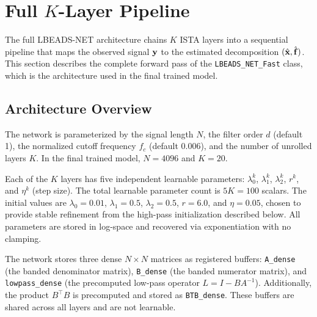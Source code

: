 \section{Full $K$-Layer Pipeline}
\label{sec:method_pipeline}

The full LBEADS-NET architecture chains $K$ ISTA layers into a sequential pipeline that maps the observed signal $\mathbf{y}$ to the estimated decomposition $(\hat{\mathbf{x}}, \hat{\mathbf{f}})$. This section describes the complete forward pass of the \texttt{LBEADS\_NET\_Fast} class, which is the architecture used in the final trained model.


\subsection{Architecture Overview}
\label{sec:method_architecture}

The network is parameterized by the signal length $N$, the filter order $d$ (default 1), the normalized cutoff frequency $f_c$ (default 0.006), and the number of unrolled layers $K$. In the final trained model, $N = 4096$ and $K = 20$.

Each of the $K$ layers has five independent learnable parameters: $\lambda_0^k$, $\lambda_1^k$, $\lambda_2^k$, $r^k$, and $\eta^k$ (step size). The total learnable parameter count is $5K = 100$ scalars. The initial values are $\lambda_0 = 0.01$, $\lambda_1 = 0.5$, $\lambda_2 = 0.5$, $r = 6.0$, and $\eta = 0.05$, chosen to provide stable refinement from the high-pass initialization described below. All parameters are stored in log-space and recovered via exponentiation with no clamping.

The network stores three dense $N \times N$ matrices as registered buffers: \texttt{A\_dense} (the banded denominator matrix), \texttt{B\_dense} (the banded numerator matrix), and \texttt{lowpass\_dense} (the precomputed low-pass operator $L = I - BA^{-1}$). Additionally, the product $B^\top B$ is precomputed and stored as \texttt{BTB\_dense}. These buffers are shared across all layers and are not learnable.



